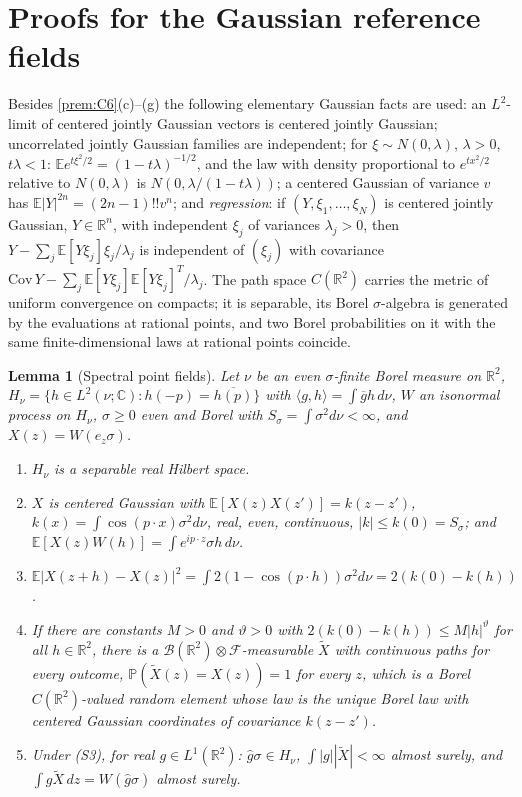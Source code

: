 \documentclass[11pt]{article}
\theoremstyle{plain}
\newtheorem{lemma}[theorem]{Lemma}
\theoremstyle{definition}
\theoremstyle{remark}
\newcommand{\R}{\mathbb{R}}
\newcommand{\C}{\mathbb{C}}
\newcommand{\E}{\mathbb{E}}
\newcommand{\PP}{\mathbb{P}}
\newcommand{\cB}{\mathcal{B}}
\newcommand{\cF}{\mathcal{F}}
\newcommand{\conj}[1]{\overline{#1}}
\begin{document}
\section{Proofs for the Gaussian reference fields}\label{app:G}

Besides \ref{prem:C6}(c)--(g) the following elementary Gaussian facts are used:
an $L^{2}$-limit of centered jointly Gaussian vectors is centered jointly Gaussian;
uncorrelated jointly Gaussian families are independent; for $\xi\sim N(0,\lambda)$, $\lambda>0$,
$t\lambda<1$: $\E e^{t\xi^{2}/2}=(1-t\lambda)^{-1/2}$, and the law with density proportional to
$e^{tx^{2}/2}$ relative to $N(0,\lambda)$ is $N(0,\lambda/(1-t\lambda))$; a centered Gaussian of variance $v$
has $\E|Y|^{2n}=(2n-1)!!v^{n}$; and \emph{regression}: if $(Y,\xi_1,\dots,\xi_N)$ is centered jointly
Gaussian, $Y\in\R^{n}$, with independent $\xi_j$ of variances $\lambda_j>0$, then
$Y-\sum_j\E[Y\xi_j]\xi_j/\lambda_j$ is independent of $(\xi_j)$ with covariance
$\mathrm{Cov}\,Y-\sum_j\E[Y\xi_j]\E[Y\xi_j]^{T}/\lambda_j$. The path space $C(\R^{2})$ carries the metric of
uniform convergence on compacts; it is separable, its Borel $\sigma$-algebra is generated
by the evaluations at rational points, and two Borel probabilities on it with the
same finite-dimensional laws at rational points coincide.

\begin{lemma}[Spectral point fields]\label{lem:G-S}
Let $\nu$ be an even $\sigma$-finite Borel measure on $\R^{2}$,
$H_\nu=\{h\in L^{2}(\nu;\C):h(-p)=\conj{h(p)}\}$ with $\langle g,h\rangle=\int\conj gh\,d\nu$, $W$ an isonormal process
on $H_\nu$, $\sigma\ge0$ even and Borel with $S_\sigma=\int\sigma^{2}d\nu<\infty$, and $X(z)=W(e_z\sigma)$.
\begin{enumerate}[label=(S\arabic*),start=0]
\item $H_\nu$ is a separable real Hilbert space.
\item $X$ is centered Gaussian with $\E[X(z)X(z')]=k(z-z')$, $k(x)=\int\cos(p\cdot x)\sigma^{2}d\nu$,
  real, even, continuous, $|k|\le k(0)=S_\sigma$; and $\E[X(z)W(h)]=\int e^{ip\cdot z}\sigma h\,d\nu$.
\item $\E|X(z+h)-X(z)|^{2}=\int2(1-\cos(p\cdot h))\sigma^{2}d\nu=2(k(0)-k(h))$.
\item If there are constants $M>0$ and $\vartheta>0$ with $2(k(0)-k(h))\le M|h|^{\vartheta}$ for
  all $h\in\R^{2}$, there is a $\cB(\R^{2})\otimes\cF$-measurable $\tilde X$ with
  continuous paths for every outcome, $\PP(\tilde X(z)=X(z))=1$ for every $z$, which is a
  Borel $C(\R^{2})$-valued random element whose law is the unique Borel law with
  centered Gaussian coordinates of covariance $k(z-z')$.
\item Under (S3), for real $g\in L^{1}(\R^{2})$: $\hat g\sigma\in H_\nu$, $\int|g||\tilde X|<\infty$ almost surely, and
  $\int g\tilde X\,dz=W(\hat g\sigma)$ almost surely.
\end{enumerate}
\end{lemma}
\end{document}
